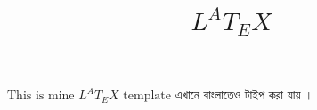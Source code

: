 \documentclass{article}
\begin{document}
	\title{\(L^AT_EX\)}
	\date{}
	\maketitle
	\(\text{This is mine } L^AT_EX \text{ template}\)  এখানে বাংলাতেও টাইপ 
	করা যায় । 
\end{document}
